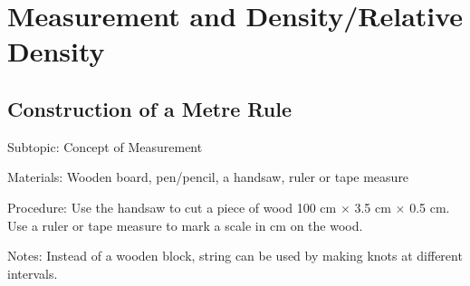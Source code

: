 \section{Measurement and Density/Relative Density}	


\subsection{Construction of a Metre Rule}
\label{sub:metrerule}

\begin{description*}
\item[Subtopic:]{Concept of Measurement}
\item[Materials:]{Wooden board, pen\slash pencil, a handsaw, ruler or tape measure}
\item[Procedure:]{Use the handsaw to cut a piece of wood 100 cm $\times$ 3.5 cm $\times$ 0.5 cm. Use a ruler or tape measure to mark a scale in cm on the wood.}
\item[Notes:]{Instead of a wooden block, string can be used by making knots at different intervals.}
\end{description*}

